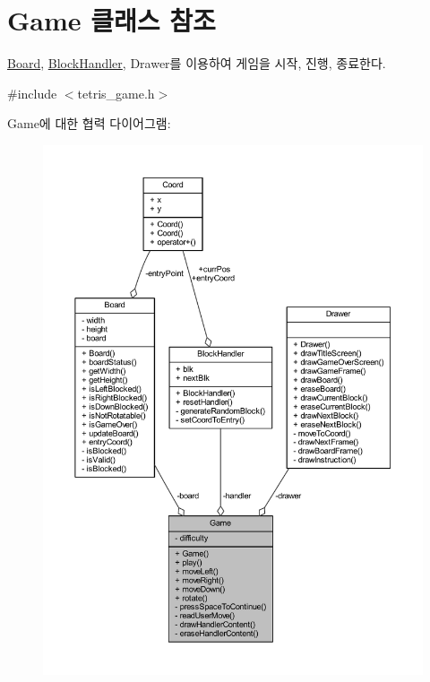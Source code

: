 \hypertarget{class_game}{}\section{Game 클래스 참조}
\label{class_game}


\mbox{\hyperlink{class_board}{Board}}, \mbox{\hyperlink{class_block_handler}{Block\+Handler}}, Drawer를 이용하여 게임을 시작, 진행, 종료한다.  




{\ttfamily \#include $<$tetris\+\_\+game.\+h$>$}



Game에 대한 협력 다이어그램\+:
\nopagebreak
\begin{figure}[H]
\begin{center}
\leavevmode
\includegraphics[width=350pt]{class_game__coll__graph}
\end{center}
\end{figure}
